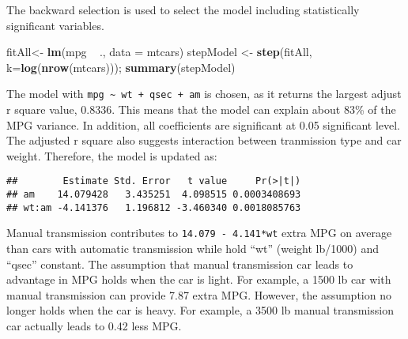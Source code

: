 \documentclass[]{article}
\newenvironment{Shaded}{\begin{snugshade}}{\end{snugshade}}
\newcommand{\KeywordTok}[1]{\textcolor[rgb]{0.13,0.29,0.53}{\textbf{{#1}}}}
\newcommand{\DataTypeTok}[1]{\textcolor[rgb]{0.13,0.29,0.53}{{#1}}}
\newcommand{\DecValTok}[1]{\textcolor[rgb]{0.00,0.00,0.81}{{#1}}}
\newcommand{\StringTok}[1]{\textcolor[rgb]{0.31,0.60,0.02}{{#1}}}
\newcommand{\NormalTok}[1]{{#1}}
\begin{document}
The backward selection is used to select the model including
statistically significant variables.

\begin{Shaded}
\begin{Highlighting}[]
\NormalTok{fitAll<-}\StringTok{ }\KeywordTok{lm}\NormalTok{(mpg ~}\StringTok{ }\NormalTok{., }\DataTypeTok{data =} \NormalTok{mtcars)}
\NormalTok{stepModel <-}\StringTok{ }\KeywordTok{step}\NormalTok{(fitAll, }\DataTypeTok{k=}\KeywordTok{log}\NormalTok{(}\KeywordTok{nrow}\NormalTok{(mtcars))); }\KeywordTok{summary}\NormalTok{(stepModel)}
\end{Highlighting}
\end{Shaded}

The model with \texttt{mpg \textasciitilde{} wt + qsec + am} is chosen,
as it returns the largest adjust r square value, 0.8336. This means that
the model can explain about 83\% of the MPG variance. In addition, all
coefficients are significant at 0.05 significant level. The adjusted r
square also suggests interaction between tranmission type and car
weight. Therefore, the model is updated as:

\begin{Shaded}
\end{Shaded}

\begin{verbatim}
##        Estimate Std. Error   t value     Pr(>|t|)
## am    14.079428   3.435251  4.098515 0.0003408693
## wt:am -4.141376   1.196812 -3.460340 0.0018085763
\end{verbatim}

Manual transmission contributes to \texttt{14.079 - 4.141*wt} extra MPG
on average than cars with automatic transmission while hold ``wt''
(weight lb/1000) and ``qsec'' constant. The assumption that manual
transmission car leads to advantage in MPG holds when the car is light.
For example, a 1500 lb car with manual transmission can provide 7.87
extra MPG. However, the assumption no longer holds when the car is
heavy. For example, a 3500 lb manual transmission car actually leads to
0.42 less MPG.
\end{document}

